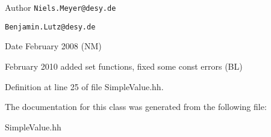 \begin{DoxyAuthor}{Author}
{\tt Niels.Meyer@desy.de} 

{\tt Benjamin.Lutz@desy.de} 
\end{DoxyAuthor}
\begin{DoxyDate}{Date}
February 2008 (NM) 

February 2010 added set functions, fixed some const errors (BL) 
\end{DoxyDate}


Definition at line 25 of file SimpleValue.hh.

The documentation for this class was generated from the following file:\begin{DoxyCompactItemize}
\item 
SimpleValue.hh\end{DoxyCompactItemize}
